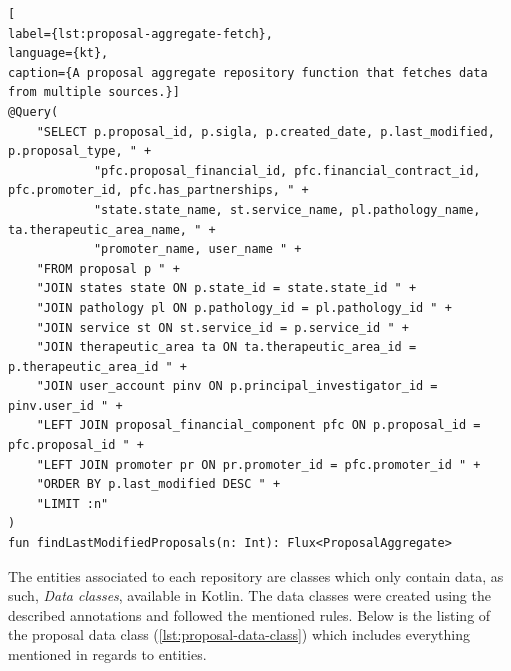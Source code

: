 \begin{lstlisting}[
label={lst:proposal-aggregate-fetch},
language={kt},
caption={A proposal aggregate repository function that fetches data from multiple sources.}]
@Query(
    "SELECT p.proposal_id, p.sigla, p.created_date, p.last_modified, p.proposal_type, " +
            "pfc.proposal_financial_id, pfc.financial_contract_id, pfc.promoter_id, pfc.has_partnerships, " +
            "state.state_name, st.service_name, pl.pathology_name, ta.therapeutic_area_name, " +
            "promoter_name, user_name " +
    "FROM proposal p " +
    "JOIN states state ON p.state_id = state.state_id " +
    "JOIN pathology pl ON p.pathology_id = pl.pathology_id " +
    "JOIN service st ON st.service_id = p.service_id " +
    "JOIN therapeutic_area ta ON ta.therapeutic_area_id = p.therapeutic_area_id " +
    "JOIN user_account pinv ON p.principal_investigator_id = pinv.user_id " +
    "LEFT JOIN proposal_financial_component pfc ON p.proposal_id = pfc.proposal_id " +
    "LEFT JOIN promoter pr ON pr.promoter_id = pfc.promoter_id " +
    "ORDER BY p.last_modified DESC " +
    "LIMIT :n"
)
fun findLastModifiedProposals(n: Int): Flux<ProposalAggregate>
\end{lstlisting}

The entities associated to each repository are classes which only contain data, as such, \textit{Data classes}, available in Kotlin. 
The data classes were created using the described annotations and followed the mentioned rules. Below is the listing of the proposal data class (\ref{lst:proposal-data-class}) which includes everything mentioned in regards to entities.

